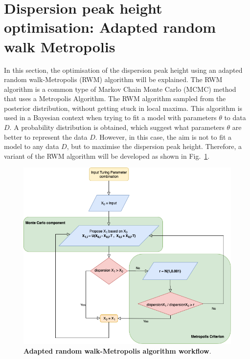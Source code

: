 \section{Dispersion peak height optimisation: Adapted random walk Metropolis}\label{dispersion_peak_optimisation}
In this section, the optimisation of the dispersion peak height using an adapted random walk-Metropolis (RWM) algorithm will be explained.
The RWM algorithm is a common type of Markov Chain Monte Carlo (MCMC) method that uses a Metropolis Algorithm.
The RWM algorithm sampled from the posterior distribution, without getting stuck in local maxima.
This algorithm is used in a Bayesian context when trying to fit a model with parameters $\theta$ to data $D$.
A probability distribution is obtained, which suggest what parameters $\theta$ are better to represent the data $D$.
However, in this case, the aim is not to fit a model to any data $D$, but to maximise the dispersion peak height.
Therefore, a variant of the RWM algorithm will be developed as shown in Fig.~\ref{Simulated Annealing}.

\begin{figure}[H]
    \centering
    \includegraphics[width=1\textwidth]{chapters/Methods/Simulated Annealing}
    \caption{\textbf{Adapted random walk-Metropolis algorithm workflow}.  }
    \label{Simulated Annealing}
\end{figure}

